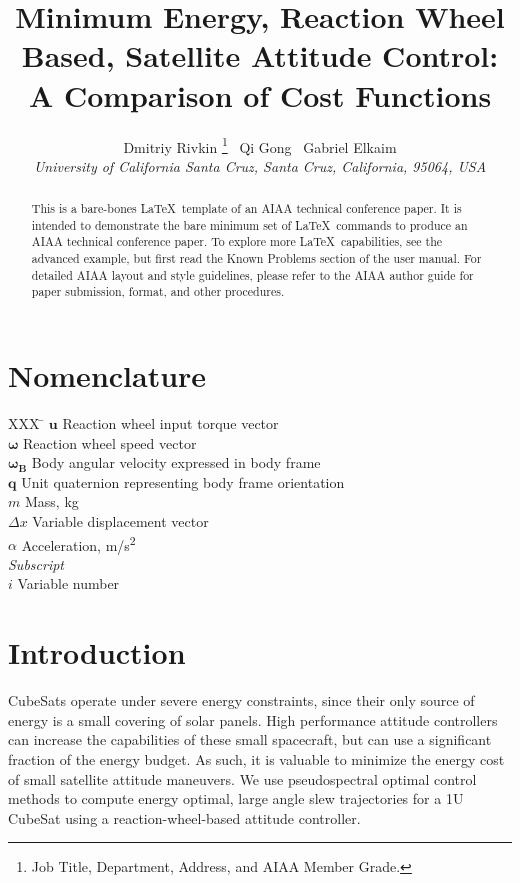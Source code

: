 \documentclass[]{aiaa-tc}%
\title{Minimum Energy, Reaction Wheel Based, Satellite Attitude Control: A Comparison of Cost Functions}
\author{
  Dmitriy Rivkin%
    \thanks{Job Title, Department, Address, and AIAA Member Grade.}
  \, 
  Qi Gong\thanksibid{1}
  \, Gabriel Elkaim\thanksibid{1}\\
  {\normalsize\itshape
   University of California Santa Cruz, Santa Cruz, California, 95064, USA}\\
 }
\begin{document}
\maketitle

\begin{abstract}
This is a bare-bones \LaTeX\ template of an AIAA technical conference paper.
It is intended to demonstrate the bare minimum set of \LaTeX\ commands
to produce an AIAA technical conference paper.
To explore more \LaTeX\ capabilities, see the advanced example, but
first read the Known Problems section of the user manual.
For detailed AIAA layout and style guidelines, please refer to the AIAA
author guide for paper submission, format, and other procedures.
\end{abstract}

\section*{Nomenclature}

\begin{tabbing}
  XXX \= \kill%
  $\mathbf{u}$ \> Reaction wheel input torque vector \\
  $\pmb{\omega}$ \> Reaction wheel speed vector \\
  $\pmb{\omega_{B}}$ \> Body angular velocity expressed in body frame\\
  $\mathbf{q}$ \> Unit quaternion representing body frame    orientation \\
  $m$ \> Mass, kg \\
  $\Delta x$ \> Variable displacement vector \\
  $\alpha$ \> Acceleration, m/s\textsuperscript{2} \\[5pt]
  \textit{Subscript}\\
  $i$ \> Variable number \\
 \end{tabbing}

\section{Introduction}

CubeSats operate under severe energy constraints, since their only source of energy is a small covering of solar panels. High performance attitude controllers can increase the capabilities of these small spacecraft, but can use a significant fraction of the energy budget. As such, it is valuable to minimize the energy cost of small satellite attitude maneuvers. We use pseudospectral optimal control methods to compute energy optimal, large angle slew trajectories for a 1U CubeSat using a reaction-wheel-based attitude controller. 
\end{document}
